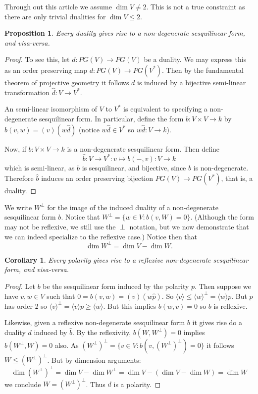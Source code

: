\documentclass[12pt]{article}
\newtheorem{coro}[thm]{Corollary}
\newtheorem{prop}[thm]{Proposition}
\begin{document}
Through out this article we assume $\dim V\neq 2$.  This is not a true constraint as there are only trivial dualities for $\dim V\leq 2$.

\begin{prop}
Every duality gives rise to a non-degenerate sesquilinear form,
and visa-versa.
\end{prop}
\begin{proof}
To see this, let $d:PG(V)\rightarrow PG(V)$ be a duality.  We may express this as an order preserving map $d:PG(V)\rightarrow PG(V^*)$.  Then by the fundamental theorem of projective geometry it follows $d$
is induced by a bijective semi-linear transformation $\hat{d}:V\rightarrow V^*$. 

An semi-linear isomorphism of $V$ to $V^*$ is equivalent to specifying a non-degenerate sesquilinear form. In particular, define the form $b:V\times V\rightarrow k$ by $b(v,w)=(v)(w\hat{d})$ (notice $w\hat{d}\in V^*$ so $w\hat{d}:V\rightarrow k$).

Now, if $b:V\times V\rightarrow k$ is a non-degenerate sesquilinear form.  Then
define
\[\hat{b}:V\rightarrow V^*:v\mapsto b(-,v):V\rightarrow k\]
which is semi-linear, as $b$ is sesquilinear, and bijective, since $b$ is
non-degenerate.   Therefore $\hat{b}$ induces an order preserving bijection $PG(V)\rightarrow PG(V^*)$, that is, a duality.
\end{proof}

We write $W^\perp$ for the image of the induced duality of a non-degenerate
sesquilinear form $b$.  Notice that $W^\perp=\{w\in V:b(v,W)=0\}$.  (Although the form may not be reflexive, we still use the $\perp$ notation, but we now demonstrate that we can indeed specialize to the reflexive case.)
Notice then that
\[\dim W^\perp=\dim V-\dim W.\]

\begin{coro}
Every polarity gives rise to a reflexive non-degenerate sesquilinear form,
and visa-versa.
\end{coro}
\begin{proof}
Let $b$ be the sesquilinear form induced by the polarity $p$.  Then suppose we
have $v,w\in V$ such that $0=b(v,w)=(v)(w\hat{p})$.  So 
$\langle v\rangle \leq \langle w\rangle^\perp=\langle w\rangle p$.  But $p$ has order 2 so $\langle v\rangle^\perp=\langle v\rangle p\geq \langle w\rangle$.  But this implies $b(w,v)=0$ so $b$ is reflexive.

Likewise, given a reflexive non-degenerate sesquilinear form $b$ it gives rise
do a duality $d$ induced by $\hat{b}$.  By the reflexivity, $b(W,W^\perp)=0$ implies $b(W^\perp, W)=0$ also.  As $(W^\perp)^\perp=\{v\in V:b(v,(W^\perp)^\perp)=0\}$ it follows $W\leq (W^\perp)^\perp$.  But by 
dimension arguments: 
\[\dim (W^\perp)^\perp =\dim V-\dim W^\perp=\dim V-(\dim V-\dim W)=\dim W\]
we conclude $W=(W^\perp)^\perp$.  Thus $d$ is a polarity.
\end{proof}
\end{document}
